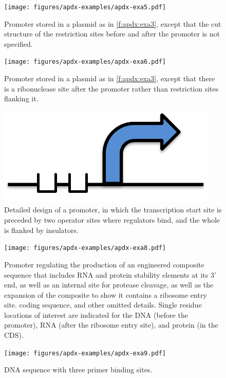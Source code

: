 \begin{figure}[h!]
\texttt{[image: figures/apdx-examples/apdx-exa5.pdf]}
\caption{Promoter stored in a plasmid as in \ref{f:apdx:exa3}, except that the cut structure of the restriction sites before and after the promoter is not specified.}
\label{f:apdx:exa5}
\end{figure}

\begin{figure}[h!]
\texttt{[image: figures/apdx-examples/apdx-exa6.pdf]}
\caption{Promoter stored in a plasmid as in \ref{f:apdx:exa3}, except that there is a ribonuclease site after the promoter rather than restriction sites flanking it.}
\label{f:apdx:exa6}
\end{figure}

\begin{figure}[h!]
\includegraphics[scale=0.5]{figures/apdx-examples/apdx-exa7.pdf}
\caption{Detailed design of a promoter, in which the transcription start site is preceded by two operator sites where regulators bind, and the whole is flanked by insulators.}
\label{f:apdx:exa7}
\end{figure}

\begin{figure}[h!]
\texttt{[image: figures/apdx-examples/apdx-exa8.pdf]}
\caption{Promoter regulating the production of an engineered composite sequence that includes RNA and protein stability elements at its 3' end, as well as an internal site for protease cleavage, as well as the expansion of the composite to show it contains a ribosome entry site. coding sequence, and other omitted details.  Single residue locations of interest are indicated for the DNA (before the promoter), RNA (after the ribosome entry site), and protein (in the CDS).}
\label{f:apdx:exa8}
\end{figure}

\begin{figure}[h!]
\texttt{[image: figures/apdx-examples/apdx-exa9.pdf]}
\caption{DNA sequence with three primer binding sites.}
\label{f:apdx:exa9}
\end{figure}

